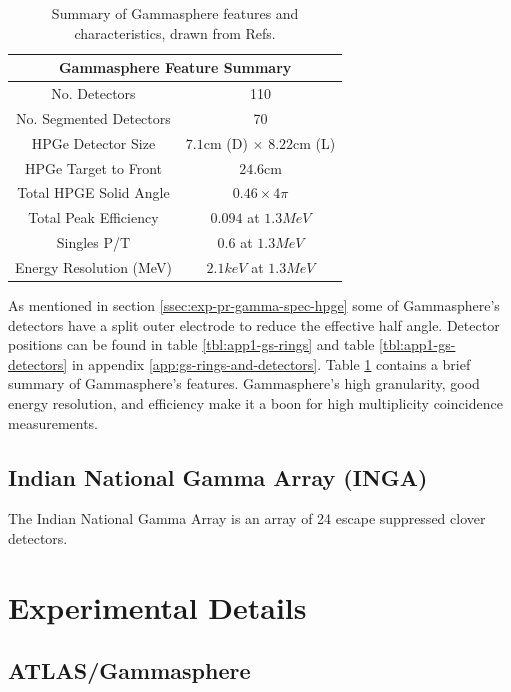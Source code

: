 \begin{table}
\begin{center}
\begin{tabular}{|c|c|}
\hline
\hline \multicolumn{2}{|c|}{Gammasphere Feature Summary}  \\ 
\hline No. Detectors             & 110 \\ 
No. Segmented Detectors   & 70 \\ 
HPGe Detector Size        & $7.1$cm (D) $\times$ $8.22$cm (L) \\ 
HPGe Target to Front      & $24.6$cm\\ 
Total HPGE Solid Angle    & $0.46 \times 4\pi$\\ 
Total Peak Efficiency     & $0.094$ at $1.3 MeV$\\ 
Singles P/T               & $0.6$ at $1.3 MeV$ \\ 
Energy Resolution (MeV)   & $2.1keV$ at $1.3 MeV$ \\ 
\hline 
\hline 
\end{tabular}
\end{center}
\caption{Summary of Gammasphere features and characteristics, drawn from Refs. \cite{TheGS,SimulatedResGS,GSComptonSuppression,largeArrays}}
\label{tbl:gs-summary}
\end{table}

As mentioned in section \ref{ssec:exp-pr-gamma-spec-hpge} some of Gammasphere's detectors have a split outer electrode to reduce the effective half angle. Detector positions can be found in table \ref{tbl:app1-gs-rings} and table \ref{tbl:app1-gs-detectors} in appendix \ref{app:gs-rings-and-detectors}. Table \ref{tbl:gs-summary} contains a brief summary of Gammasphere's features. Gammasphere's high granularity, good energy resolution, and efficiency make it a boon for high \gr{} multiplicity coincidence measurements.

\subsection{Indian National Gamma Array (INGA)}
\label{ssec:exp-pr-gamma-spec-inga}
The Indian National Gamma Array is an array of 24 escape suppressed clover detectors.

\section{Experimental Details}
\label{sec:exp-pr-details}
\subsection{ATLAS/Gammasphere}
\label{ssec:exp-pr-details-gs}
